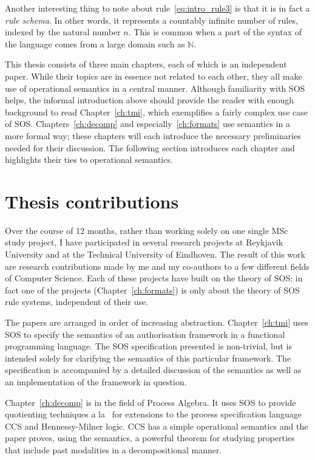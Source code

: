Another interesting thing to note about rule~\ref{eq:intro_rule3} is that it is
in fact a \emph{rule schema}. In other words, it represents a countably infinite
number of rules, indexed by the natural number $n$. This is common when a part
of the syntax of the language comes from a large domain such as $\mathbb{N}$.

\vspace{1em}

This thesis consists of three main chapters, each of which is an independent paper.
While their topics are in essence not related to each other, they all make use of
operational semantics in a central manner. Although familiarity with SOS helps, the
informal introduction above should provide the reader with enough background to read
Chapter~\ref{ch:tmi}, which exemplifies a fairly complex use case of SOS. 
Chapters~\ref{ch:decomp} and especially~\ref{ch:formats} use semantics in a more
formal way; these chapters will each introduce the necessary preliminaries needed
for their discussion. The following section introduces each chapter and highlights
their ties to operational semantics.


\section{Thesis contributions}

Over the course of 12 months, rather than working solely on one single MSc study project,
I have participated in several research projects at
Reykjavik University and at the Technical University of Eindhoven. The result of this work
are research contributions made by me and my co-authors to a few different fields
of Computer Science. Each of these projects have built on the theory of SOS; in fact
one of the projects (Chapter~\ref{ch:formats}) is only about the theory of SOS rule
systems, independent of their use.

The papers are arranged in order of increasing abstraction. Chapter~\ref{ch:tmi} uses SOS
to specify the semantics of an authorisation framework in a functional programming language.
The SOS specification presented is non-trivial, but is intended solely for clarifying
the semantics of this particular framework. The specification is accompanied by a
detailed discussion of the semantics as well as an implementation of the framework
in question.

Chapter~\ref{ch:decomp} is in the field of Process Algebra. It 
uses SOS to provide quotienting techniques a la~\cite{Larsen91} for extensions
to the process specification language CCS and Hennessy-Milner logic. CCS has a simple
operational semantics and the paper proves, using the semantics, a powerful theorem
for studying properties that include past modalities in a decompositional manner.

